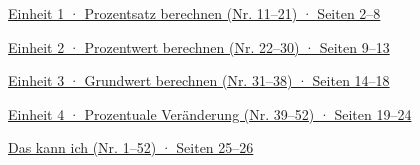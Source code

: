\documentclass[11pt]{article}
\newcommand{\verzeile}[2]{\par\noindent\hyperlink{#1}{#2}\par\medskip}
\begin{document}
\weit
{}
\verzeile{e1}{Einheit 1 · Prozentsatz berechnen (Nr. 11–21) · Seiten 2–8}
\verzeile{e2}{Einheit 2 · Prozentwert berechnen (Nr. 22–30) · Seiten 9–13}
\verzeile{e3}{Einheit 3 · Grundwert berechnen (Nr. 31–38) · Seiten 14–18}
\verzeile{e4}{Einheit 4 · Prozentuale Veränderung (Nr. 39–52) · Seiten 19–24}
\verzeile{abhaken}{Das kann ich (Nr. 1–52) · Seiten 25–26}





\end{document}
